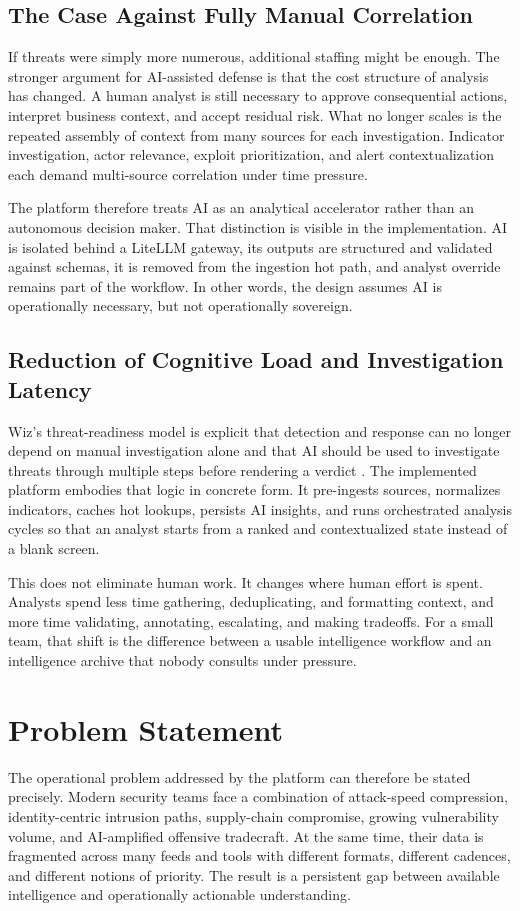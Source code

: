 \subsection{The Case Against Fully Manual Correlation}
If threats were simply more numerous, additional staffing might be enough. The stronger argument for AI-assisted defense is that the cost structure of analysis has changed. A human analyst is still necessary to approve consequential actions, interpret business context, and accept residual risk. What no longer scales is the repeated assembly of context from many sources for each investigation. Indicator investigation, actor relevance, exploit prioritization, and alert contextualization each demand multi-source correlation under time pressure.

The platform therefore treats AI as an analytical accelerator rather than an autonomous decision maker. That distinction is visible in the implementation. AI is isolated behind a LiteLLM gateway, its outputs are structured and validated against schemas, it is removed from the ingestion hot path, and analyst override remains part of the workflow. In other words, the design assumes AI is operationally necessary, but not operationally sovereign.

\subsection{Reduction of Cognitive Load and Investigation Latency}
Wiz's threat-readiness model is explicit that detection and response can no longer depend on manual investigation alone and that AI should be used to investigate threats through multiple steps before rendering a verdict \cite{wiz_ai_readiness_2026}. The implemented platform embodies that logic in concrete form. It pre-ingests sources, normalizes indicators, caches hot lookups, persists AI insights, and runs orchestrated analysis cycles so that an analyst starts from a ranked and contextualized state instead of a blank screen.

This does not eliminate human work. It changes where human effort is spent. Analysts spend less time gathering, deduplicating, and formatting context, and more time validating, annotating, escalating, and making tradeoffs. For a small team, that shift is the difference between a usable intelligence workflow and an intelligence archive that nobody consults under pressure.

\section{Problem Statement}
The operational problem addressed by the platform can therefore be stated precisely. Modern security teams face a combination of attack-speed compression, identity-centric intrusion paths, supply-chain compromise, growing vulnerability volume, and AI-amplified offensive tradecraft. At the same time, their data is fragmented across many feeds and tools with different formats, different cadences, and different notions of priority. The result is a persistent gap between available intelligence and operationally actionable understanding.

